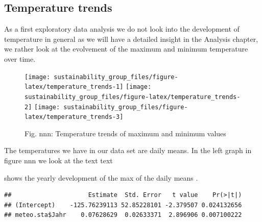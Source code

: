 \documentclass[
]{article}
\newenvironment{Shaded}{\begin{snugshade}}{\end{snugshade}}
\newcommand{\FunctionTok}[1]{\textcolor[rgb]{0.00,0.00,0.00}{#1}}
\newcommand{\NormalTok}[1]{#1}
\newcommand{\SpecialCharTok}[1]{\textcolor[rgb]{0.00,0.00,0.00}{#1}}
\begin{document}
\hfill\break

\hypertarget{temperature-trends}{%
\subsection{Temperature trends}\label{temperature-trends}}

\hfill\break

As a first exploratory data analysis we do not look into the development
of temperature in general as we will have a detailed insight in the
Analysis chapter, we rather look at the evolvement of the maximum and
minimum temperature over time.

\begin{figure}
\texttt{[image: sustainability\_group\_files/figure-latex/temperature\_trends-1]} \texttt{[image: sustainability\_group\_files/figure-latex/temperature\_trends-2]} \texttt{[image: sustainability\_group\_files/figure-latex/temperature\_trends-3]} \caption{Fig. nnn: Temperature trends of maximum and minimum values}\label{fig:temperature_trends}
\end{figure}

The temperatures we have in our data set are daily means. In the left
graph in figure nnn we look at the text text

shows the yearly development of the max of the daily means .

\begin{Shaded}
\end{Shaded}

\begin{verbatim}
##                     Estimate  Std. Error   t value    Pr(>|t|)
## (Intercept)    -125.76239113 52.85228101 -2.379507 0.024132656
## meteo.sta$Jahr    0.07628629  0.02633371  2.896906 0.007100222
\end{verbatim}

\begin{Shaded}
\end{Shaded}
\end{document}
